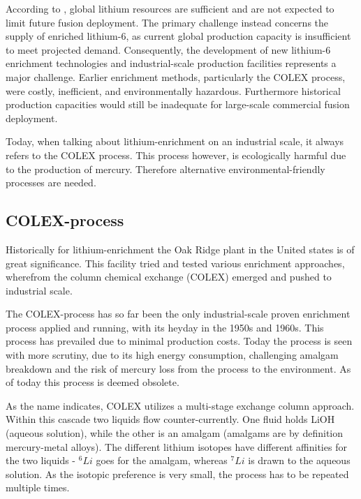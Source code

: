 According to \textcite{WARD2025101997}, global lithium resources are sufficient and are not expected to limit future fusion deployment. The primary challenge instead concerns the supply of enriched lithium-6, as current global production capacity is insufficient to meet projected demand. Consequently, the development of new lithium-6 enrichment technologies and industrial-scale production facilities represents a major challenge. Earlier enrichment methods, particularly the COLEX process, were costly, inefficient, and environmentally hazardous.
Furthermore historical production capacities would still be inadequate for large-scale commercial fusion deployment. \cite{WARD2025101997}

Today, when talking about lithium-enrichment on an industrial scale, it always refers to the COLEX process. This process however, is ecologically harmful due to the production of mercury. Therefore alternative environmental-friendly processes are needed. \cite{BadeaLiIsotopes2023}

    \subsection{COLEX-process} 
    \label{subsec_colex_process}
    Historically for lithium-enrichment the Oak Ridge plant in the United states is of great significance. This facility tried and tested various enrichment approaches, wherefrom the column chemical exchange (COLEX) emerged and pushed to industrial scale. \cite{AcostaFlexer2018}

     The COLEX-process has so far been the only industrial-scale proven enrichment process applied and running, with its heyday in the 1950s and 1960s. This process has prevailed due to minimal production costs. Today the process is seen with more scrutiny, due to its high energy consumption, challenging amalgam breakdown and the risk of mercury loss from the process to the environment. As of today this process is deemed obsolete. \cite{giegerich2019lithium6} \cite{BadeaLiIsotopes2023}

    As the name indicates, COLEX utilizes a multi-stage exchange column approach. Within this cascade two liquids flow counter-currently. One fluid holds LiOH (aqueous solution), while the other is an amalgam (amalgams are by definition mercury-metal alloys). The different lithium isotopes have different affinities for the two liquids - ${}^6Li$ goes for the amalgam, whereas ${}^7Li$ is drawn to the aqueous solution. As the isotopic preference is very small, the process has to be repeated multiple times. \cite{AcostaFlexer2018}

